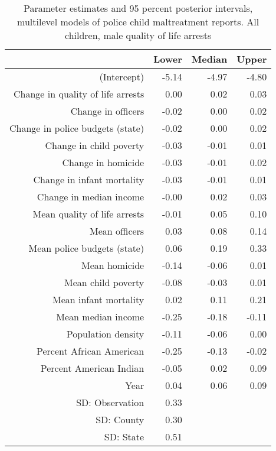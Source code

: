 \begin{table}[ht]
\centering
\begin{tabular}{rrrr}
  \hline
 & Lower & Median & Upper \\ 
  \hline
(Intercept) & -5.14 & -4.97 & -4.80 \\ 
  Change in quality of life arrests & 0.00 & 0.02 & 0.03 \\ 
  Change in officers & -0.02 & 0.00 & 0.02 \\ 
  Change in police budgets (state) & -0.02 & 0.00 & 0.02 \\ 
  Change in child poverty & -0.03 & -0.01 & 0.01 \\ 
  Change in homicide & -0.03 & -0.01 & 0.02 \\ 
  Change in infant mortality & -0.03 & -0.01 & 0.01 \\ 
  Change in median income & -0.00 & 0.02 & 0.03 \\ 
  Mean quality of life arrests & -0.01 & 0.05 & 0.10 \\ 
  Mean officers & 0.03 & 0.08 & 0.14 \\ 
  Mean police budgets (state) & 0.06 & 0.19 & 0.33 \\ 
  Mean homicide & -0.14 & -0.06 & 0.01 \\ 
  Mean child poverty & -0.08 & -0.03 & 0.01 \\ 
  Mean infant mortality & 0.02 & 0.11 & 0.21 \\ 
  Mean median income & -0.25 & -0.18 & -0.11 \\ 
  Population density & -0.11 & -0.06 & 0.00 \\ 
  Percent African American & -0.25 & -0.13 & -0.02 \\ 
  Percent American Indian & -0.05 & 0.02 & 0.09 \\ 
  Year & 0.04 & 0.06 & 0.09 \\ 
  SD: Observation & 0.33 &  &  \\ 
  SD: County & 0.30 &  &  \\ 
  SD: State & 0.51 &  &  \\ 
   \hline
\end{tabular}
\caption{Parameter estimates and 95 percent posterior intervals, multilevel models of 
             police child maltreatment reports. All children, male quality of life arrests} 
\end{table}
